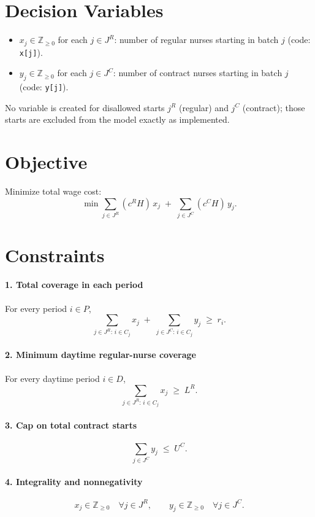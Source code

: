 \section*{Decision Variables}

\begin{itemize}
    \item $x_j \in \mathbb{Z}_{\ge 0}$ for each $j\in J^R$: number of regular nurses starting in batch $j$ (code: \texttt{x[j]}).
    \item $y_j \in \mathbb{Z}_{\ge 0}$ for each $j\in J^C$: number of contract nurses starting in batch $j$ (code: \texttt{y[j]}).
\end{itemize}

No variable is created for disallowed starts $j^R$ (regular) and $j^C$ (contract); those starts are excluded from the model exactly as implemented.

\section*{Objective}

Minimize total wage cost:
\[
\min \sum_{j\in J^R} (c^R H)\,x_j \;+\; \sum_{j\in J^C} (c^C H)\,y_j .
\]

\section*{Constraints}

\paragraph{1. Total coverage in each period}
For every period $i\in P$,
\[
\sum_{j\in J^R:\, i\in C_j} x_j \;+\; \sum_{j\in J^C:\, i\in C_j} y_j \;\ge\; r_i .
\]

\paragraph{2. Minimum daytime regular-nurse coverage}
For every daytime period $i\in D$,
\[
\sum_{j\in J^R:\, i\in C_j} x_j \;\ge\; L^R .
\]

\paragraph{3. Cap on total contract starts}
\[
\sum_{j\in J^C} y_j \;\le\; U^C .
\]

\paragraph{4. Integrality and nonnegativity}
\[
x_j \in \mathbb{Z}_{\ge 0}\quad \forall j\in J^R,
\qquad
y_j \in \mathbb{Z}_{\ge 0}\quad \forall j\in J^C.
\]

